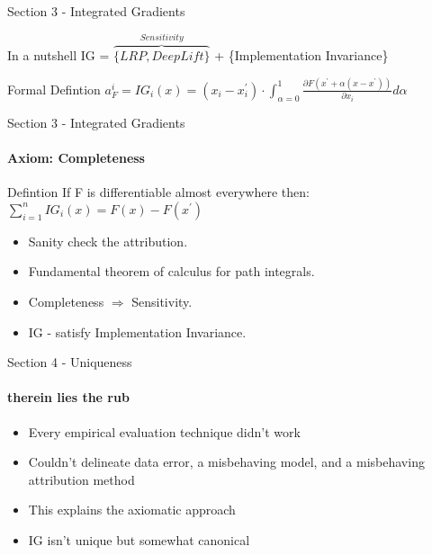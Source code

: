 \documentclass[serif]{beamer}
\begin{document}
\begin{frame}{Section 3 - Integrated Gradients}
	\begin{block}{In a nutshell}
		IG = $\overbrace{\{LRP, DeepLift\}}^{Sensitivity }$ + \{Implementation Invariance\}
	\end{block}	
	
	\begin{block}{Formal Defintion}
		$a_F^i = IG_i(x) = (x_i-x_i^\prime) \cdot \int_{\alpha=0}^{1} \frac{\partial F(x^\prime + \alpha(x-x^\prime))}{\partial x_i} d \alpha$
	\end{block}	

\end{frame}

\begin{frame}{Section 3 - Integrated Gradients}
	\framesubtitle{Axiom: Completeness}
	\begin{block}{Defintion}
		If F is differentiable almost everywhere then:
		$\sum_{i=1}^n IG_i(x) = F(x) - F(x^\prime)$
	\end{block}	
	\begin{itemize}
		\item Sanity check the attribution.
		\item Fundamental theorem of calculus for path integrals.
		\item Completeness $\Rightarrow $ Sensitivity.
		\item IG - satisfy Implementation Invariance.
	\end{itemize}
\end{frame}

\begin{frame}{Section 4 - Uniqueness}
	\framesubtitle{therein lies the rub}
	\begin{itemize}
		\item Every empirical evaluation technique didn't work
		\item Couldn't delineate data error, a misbehaving model, and a misbehaving attribution method
		\item This explains the axiomatic approach 
		\item IG isn't unique but somewhat canonical 
	\end{itemize}
\end{frame}
\end{document}
